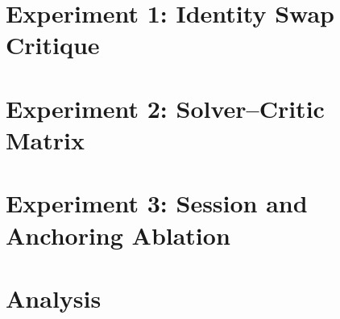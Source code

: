 \documentclass[11pt]{article}
\begin{document}
\section{Experiment 1: Identity Swap Critique}
\label{sec:exp1}


\section{Experiment 2: Solver--Critic Matrix}
\label{sec:exp2}


\section{Experiment 3: Session and Anchoring Ablation}
\label{sec:exp3}


\section{Analysis}
\label{sec:analysis}
\end{document}
